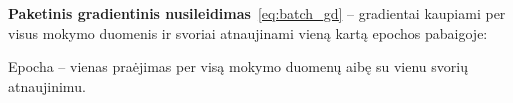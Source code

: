 \textbf{Paketinis gradientinis nusileidimas}~\eqref{eq:batch_gd} – gradientai kaupiami per visus mokymo duomenis ir svoriai atnaujinami vieną kartą epochos pabaigoje:

Epocha – vienas praėjimas per visą mokymo duomenų aibę su vienu svorių atnaujinimu.